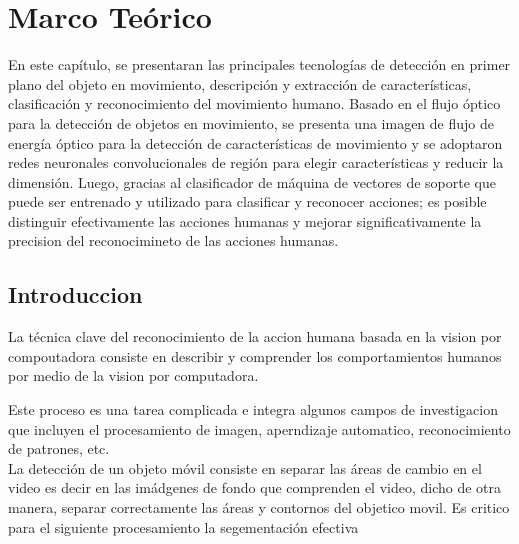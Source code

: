 \chapter{Marco Teórico}

En este capítulo, se presentaran las principales tecnologías de detección en primer 
plano del objeto en movimiento, descripción y extracción de características, 
clasificación y reconocimiento del movimiento humano. Basado en el flujo óptico
para la detección de objetos en movimiento, se presenta una imagen de flujo de
energía óptico para la detección de características de movimiento y se 
adoptaron redes neuronales convolucionales de región para elegir 
características y reducir la dimensión. Luego, gracias al clasificador
de máquina de vectores de soporte que puede ser entrenado y utilizado 
para clasificar y reconocer acciones; es posible distinguir efectivamente
las acciones humanas y mejorar significativamente la precision del reconocimineto de las acciones humanas.

\section{Introduccion}

La técnica clave del reconocimiento de la accion humana basada en la
vision  por compoutadora consiste en describir y comprender los comportamientos humanos
por medio de la vision por computadora.

Este proceso es una tarea complicada e integra algunos campos de investigacion
que incluyen el procesamiento de imagen, aperndizaje automatico, reconocimiento de patrones, etc.\\

La detección de un objeto móvil consiste en separar las áreas de cambio en el video
es decir en las imádgenes de fondo que comprenden el video, dicho de otra manera, separar
correctamente las áreas y contornos del objetico movil. 
Es critico para el siguiente procesamiento la segementación efectiva 